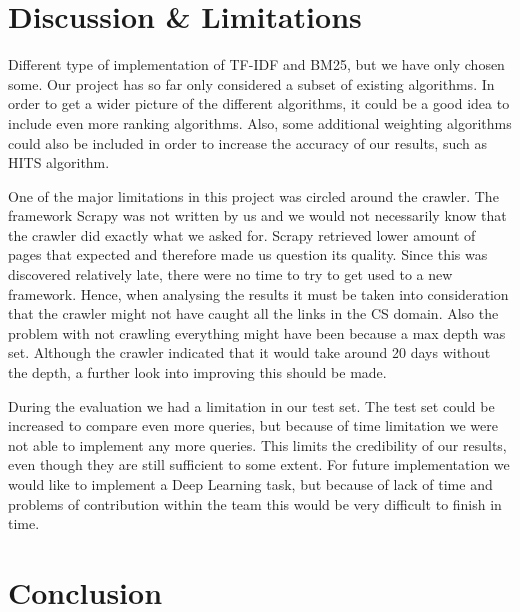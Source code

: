 

\section{Discussion \& Limitations} %
\label{sec:discussion_&_limitations}

Different type of implementation of TF-IDF and BM25, but we have only chosen some. 
Our project has so far only considered a subset of existing algorithms. In order to get a wider picture of the different algorithms, it could be a good idea to include even more ranking algorithms. Also, some additional weighting algorithms could also be included in order to increase the accuracy of our results, such as HITS algorithm.

One of the major limitations in this project was circled around the crawler. The framework Scrapy was not written by us and we would not necessarily know that the crawler did exactly what we asked for. Scrapy retrieved lower amount of pages that expected and therefore made us question its quality. Since this was discovered relatively late, there were no time to try to get used to a new framework. Hence, when analysing the results it must be taken into consideration that the crawler might not have caught all the links in the CS domain. Also the problem with not crawling everything might have been because a max depth was set. Although the crawler indicated that it would take around 20 days without the depth, a further look into improving this should be made.

During the evaluation we had a limitation in our test set. The test set could be increased to compare even more queries, but because of time limitation we were not able to implement any more queries. This limits the credibility of our results, even though they are still sufficient to some extent. For future implementation we would like to implement a Deep Learning task, but because of lack of time and problems of contribution within the team this would be very difficult to finish in time. 


\section{Conclusion} %
\label{sec:conclusion}



